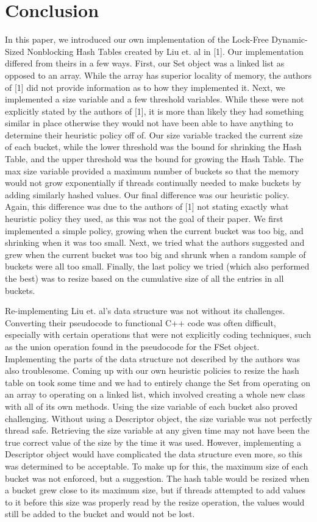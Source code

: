 \documentclass[11pt]{article} %
\begin{document}
\section{Conclusion}

In this paper, we introduced our own implementation of the Lock-Free Dynamic-Sized Nonblocking Hash Tables created by Liu et. al in [1]. Our implementation differed from theirs in a few ways. First, our Set object was a linked list as opposed to an array. While the array has superior locality of memory, the authors of [1] did not provide information as to how they implemented it. Next, we implemented a size variable and a few threshold variables. While these were not explicitly stated by the authors of [1], it is more than likely they had something similar in place otherwise they would not have been able to have anything to determine their heuristic policy off of. Our size variable tracked the current size of each bucket, while the lower threshold was the bound for shrinking the Hash Table, and the upper threshold was the bound for growing the Hash Table. The max size variable provided a maximum number of buckets so that the memory would not grow exponentially if threads continually needed to make buckets by adding similarly hashed values. Our final difference was our heuristic policy. Again, this difference was due to the authors of [1] not stating exactly what heuristic policy they used, as this was not the goal of their paper. We first implemented a simple policy, growing when the current bucket was too big, and shrinking when it was too small. Next, we tried what the authors suggested and grew when the current bucket was too big and shrunk when a random sample of buckets were all too small. Finally, the last policy we tried (which also performed the best) was to resize based on the cumulative size of all the entries in all buckets. 

Re-implementing Liu et. al's data structure was not without its challenges. Converting their pseudocode to functional C++ code was often difficult, especially with certain operations that were not explicitly coding techniques, such as the union operation found in the pseudocode for the FSet object. Implementing the parts of the data structure not described by the authors was also troublesome. Coming up with our own heuristic policies to resize the hash table on took some time and we had to entirely change the Set from operating on an array to operating on a linked list, which involved creating a whole new class with all of its own methods. Using the size variable of each bucket also proved challenging. Without using a Descriptor object, the size variable was not perfectly thread safe. Retrieving the size variable at any given time may not have been the true correct value of the size by the time it was used. However, implementing a Descriptor object would have complicated the data structure even more, so this was determined to be acceptable. To make up for this, the maximum size of each bucket was not enforced, but a suggestion. The hash table would be resized when a bucket grew close to its maximum size, but if threads attempted to add values to it before this size was properly read by the resize operation, the values would still be added to the bucket and would not be lost. 
\end{document}
